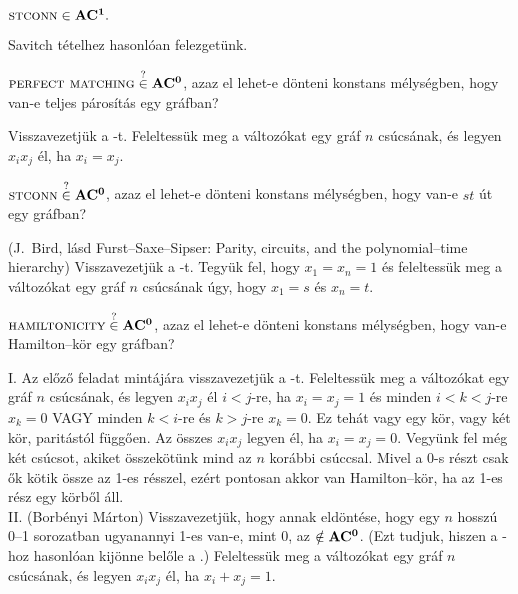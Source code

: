 \begin{Exercise}[counter={sorszam}, difficulty=0]
	$\la{STconn} \in \ACone.$
\end{Exercise}
\begin{Answer}
	Savitch t\'etelhez hasonl\'oan felezget\"unk.
\end{Answer}

\begin{Exercise}[counter={sorszam}, difficulty=0]
	$\la{Perfect Matching} \stackrel ?\in \ACnull$, azaz el lehet-e d\"onteni konstans m\'elys\'egben, hogy van-e teljes p\'aros\'it\'as egy gr\'afban?
\end{Exercise}
\begin{Answer}
	Visszavezetj\"uk a -t. Feleltess\"uk meg a v\'altoz\'okat egy gr\'af $n$ cs\'ucs\'anak, \'es legyen $x_ix_j$ \'el, ha $x_i=x_j$.
\end{Answer}

\begin{Exercise}[counter={sorszam}, difficulty=0]
	$\la{STconn} \stackrel ?\in \ACnull$, azaz el lehet-e d\"onteni konstans m\'elys\'egben, hogy van-e $st$ \'ut egy gr\'afban?
\end{Exercise}
\begin{Answer}
	(J.~Bird, l\'asd Furst--Saxe--Sipser: Parity, circuits, and the polynomial--time hierarchy) Visszavezetj\"uk a -t. Tegy\"uk fel, hogy $x_1=x_n=1$ \'es feleltess\"uk meg a v\'altoz\'okat egy gr\'af $n$ cs\'ucs\'anak \'ugy, hogy $x_1=s$ \'es $x_n=t$.
\end{Answer}

\begin{Exercise}[counter={sorszam}, difficulty=0]
	$\la{Hamiltonicity} \stackrel ?\in \ACnull$, azaz el lehet-e d\"onteni konstans m\'elys\'egben, hogy van-e Hamilton--k\"or egy gr\'afban?
\end{Exercise}
\begin{Answer}
	I. Az el\H oz\H o feladat mint\'aj\'ara visszavezetj\"uk a -t. Feleltess\"uk meg a v\'altoz\'okat egy gr\'af $n$ cs\'ucs\'anak, \'es legyen $x_ix_j$ \'el $i<j$-re, ha $x_i=x_j=1$ \'es minden $i<k<j$-re $x_k=0$ VAGY minden $k<i$-re \'es $k>j$-re $x_k=0$. Ez teh\'at vagy egy k\"or, vagy k\'et k\"or, parit\'ast\'ol f\"ugg\H oen. Az \"osszes $x_ix_j$ legyen \'el, ha $x_i=x_j=0$. Vegy\"unk fel m\'eg k\'et cs\'ucsot, akiket \"osszek\"ot\"unk mind az $n$ kor\'abbi cs\'uccsal. Mivel a 0-s r\'eszt csak \H ok k\"otik \"ossze az 1-es r\'esszel, ez\'ert pontosan akkor van Hamilton--k\"or, ha az 1-es r\'esz egy k\"orb\H ol \'all.\\
	II. (Borb\'enyi M\'arton) Visszavezetj\"uk, hogy annak eld\"ont\'ese, hogy egy $n$ hossz\'u 0--1 sorozatban ugyanannyi 1-es van-e, mint 0, az $\notin \mbox{\ensuremath{\mathbf{AC^0}}}$.
	(Ezt tudjuk, hiszen a -hoz hasonl\'oan kij\"onne bel\H ole a .)
	Feleltess\"uk meg a v\'altoz\'okat egy gr\'af $n$ cs\'ucs\'anak, \'es legyen $x_ix_j$ \'el, ha $x_i+x_j=1$.
\end{Answer}


